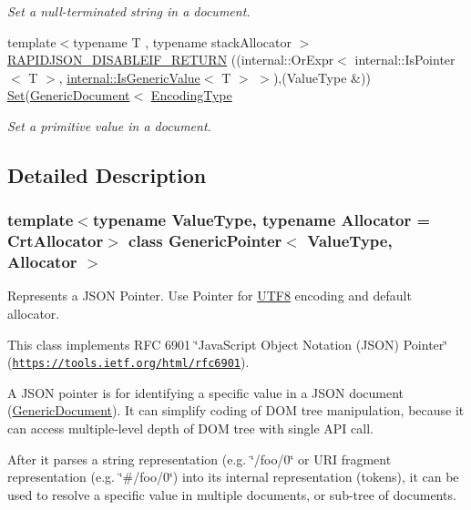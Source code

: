 \begin{DoxyCompactItemize}
\begin{DoxyCompactList}\small\item\em Set a null-\/terminated string in a document. \end{DoxyCompactList}\item 
{\footnotesize template$<$typename T , typename stack\+Allocator $>$ }\\\hyperlink{classGenericPointer_a1bb4a253f33687734e5b20795632a801}{R\+A\+P\+I\+D\+J\+S\+O\+N\+\_\+\+D\+I\+S\+A\+B\+L\+E\+I\+F\+\_\+\+R\+E\+T\+U\+RN} ((internal\+::\+Or\+Expr$<$ internal\+::\+Is\+Pointer$<$ T $>$, \hyperlink{structinternal_1_1IsGenericValue}{internal\+::\+Is\+Generic\+Value}$<$ T $>$ $>$),(Value\+Type \&)) \hyperlink{classGenericPointer_a71476d125a276b62a246990da1bd3468}{Set}(\hyperlink{classGenericDocument}{Generic\+Document}$<$ \hyperlink{classGenericPointer_a4b802da797a7a0b615fd9611cedb7c3b}{Encoding\+Type}
\begin{DoxyCompactList}\small\item\em Set a primitive value in a document. \end{DoxyCompactList}\end{DoxyCompactItemize}


\subsection{Detailed Description}
\subsubsection*{template$<$typename Value\+Type, typename Allocator = Crt\+Allocator$>$\newline
class Generic\+Pointer$<$ Value\+Type, Allocator $>$}

Represents a J\+S\+ON Pointer. Use Pointer for \hyperlink{structUTF8}{U\+T\+F8} encoding and default allocator. 

This class implements R\+FC 6901 \char`\"{}\+Java\+Script Object Notation (\+J\+S\+O\+N) Pointer\char`\"{} (\href{https://tools.ietf.org/html/rfc6901}{\tt https\+://tools.\+ietf.\+org/html/rfc6901}).

A J\+S\+ON pointer is for identifying a specific value in a J\+S\+ON document (\hyperlink{classGenericDocument}{Generic\+Document}). It can simplify coding of D\+OM tree manipulation, because it can access multiple-\/level depth of D\+OM tree with single A\+PI call.

After it parses a string representation (e.\+g. \char`\"{}/foo/0\char`\"{} or U\+RI fragment representation (e.\+g. \char`\"{}\#/foo/0\char`\"{}) into its internal representation (tokens), it can be used to resolve a specific value in multiple documents, or sub-\/tree of documents.

